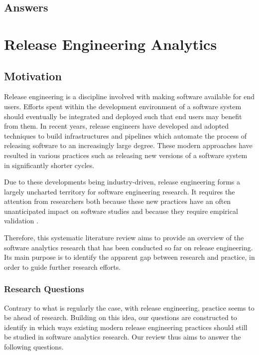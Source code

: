 \documentclass[]{book}
\begin{document}
\section{Answers}\label{answers-2}

\chapter{Release Engineering
Analytics}\label{release-engineering-analytics}

\section{Motivation}\label{motivation-4}

Release engineering is a discipline involved with making software
available for end users. Efforts spent within the development
environment of a software system should eventually be integrated and
deployed such that end users may benefit from them. In recent years,
release engineers have developed and adopted techniques to build
infrastructures and pipelines which automate the process of releasing
software to an increasingly large degree. These modern approaches have
resulted in various practices such as releasing new versions of a
software system in significantly shorter cycles.

Due to these developments being industry-driven, release engineering
forms a largely uncharted territory for software engineering research.
It requires the attention from researchers both because these new
practices have an often unanticipated impact on software studies and
because they require empirical validation \citep{adams2016a}.

Therefore, this systematic literature review aims to provide an overview
of the software analytics research that has been conducted so far on
release engineering. Its main purpose is to identify the apparent gap
between research and practice, in order to guide further research
efforts.

\subsection{Research Questions}\label{research-questions}

Contrary to what is regularly the case, with release engineering,
practice seems to be ahead of research. Building on this idea, our
questions are constructed to identify in which ways existing modern
release engineering practices should still be studied in software
analytics research. Our review thus aims to answer the following
questions.
\end{document}

